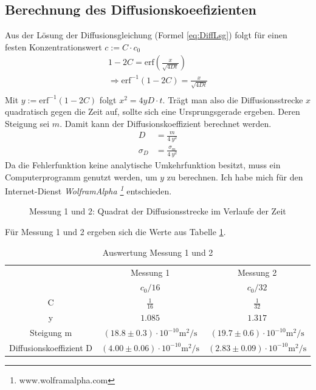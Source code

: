 \documentclass[12pt,a4paper,titlepage,headinclude,bibtotoc]{scrartcl}
\newcommand{\erf}{\ensuremath{\text{erf}}}
\begin{document}
\subsection{Berechnung des Diffusionskoeefizienten}
Aus der Lösung der Diffusionsgleichung  (Formel \ref{eq:DiffLsg}) folgt für einen festen Konzentrationswert $c:=C\cdot c_0$
\begin{align*}
	1-2C=\erf\left(\frac{x}{\sqrt{4Dt}}\right)\\
	\Rightarrow \erf^{-1}(1-2C)=\frac{x}{\sqrt{4Dt}}\\
\end{align*}
Mit $y:=\erf^{-1}(1-2C)$ folgt $x^2=4yD\cdot t$.
Trägt man also die Diffusionsstrecke $x$ quadratisch gegen die Zeit auf, sollte sich eine Ursprungsgerade ergeben.
Deren Steigung sei $m$.
Damit kann der Diffusionskoeffizient berechnet werden.
\begin{align}
	D&=\frac{m}{4~y^2}\\
	\sigma_D&=\frac{\sigma_m}{4~y^2}
\end{align}
Da die Fehlerfunktion keine analytische Umkehrfunktion besitzt, muss ein Computerprogramm genutzt werden, um $y$ zu berechnen. Ich habe mich für den Internet-Dienst \textsl{WolframAlpha \footnote{www.wolframalpha.com}} entschieden.

\begin{figure}
	\centering	
	
	\caption{Messung 1 und 2: Quadrat der Diffusionsstrecke im Verlaufe der Zeit}
	\label{fig:mess12}
\end{figure}

Für Messung 1 und 2 ergeben sich die Werte aus Tabelle \ref{tab:ausw12}.
\begin{table}[!htb]
\centering
\begin{tabular}{|c|c|c|}
	\hline		
	& Messung 1 & Messung 2 \\
	& $c_0/16$ & $c_0/32$ \\
	\hline
	\hline
	C & $\frac{1}{16}$ & $\frac{1}{32}$\\
	y & $1.085$ & $1.317$ \\	
	\hline
	Steigung m & 
	$(18.8 \pm 0.3) \cdot 10^{-10}\si{\meter ^2 / \second}$ & 
	$(19.7 \pm 0.6) \cdot 10^{-10} \si{ \meter ^2 / \second}$ \\	
	
	Diffusionskoeffizient D &
	$(4.00 \pm 0.06) \cdot 10^{-10}\si{\meter ^2 / \second}$ & 
	$(2.83 \pm 0.09) \cdot 10^{-10} \si{ \meter ^2 / \second}$ \\	
	\hline		
\end{tabular}
\caption{Auswertung Messung 1 und 2}
\label{tab:ausw12}
\end{table}
\end{document}
